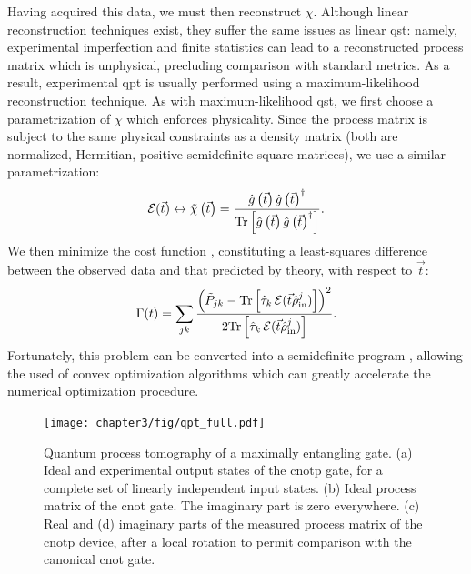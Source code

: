 Having acquired this data, we must then reconstruct $\chi$.
Although linear reconstruction techniques exist, they suffer the same issues as linear \gls{qst}: namely, experimental imperfection and finite statistics can lead to a reconstructed process matrix which is unphysical, precluding comparison with standard metrics.  
As a result, experimental \gls{qpt} is usually performed using a maximum-likelihood reconstruction technique.
As with maximum-likelihood \gls{qst}, we first choose a parametrization of $\chi$ which enforces physicality. 
Since the process matrix is subject to the same physical constraints as a density matrix (both are normalized, Hermitian, positive-semidefinite square matrices), we use a similar parametrization:
\begin{equation}
    \mathcal{E}(\vec{t}) \leftrightarrow \tilde{\chi}\left( \vec{t} \right) = 
    \frac{\hat{g}\left(\vec{t}\right) \hat{g}\left(\vec{t}\right)^{\dagger}}
    {\mathrm{Tr} \left[ \hat{g}\left(\vec{t}\right) \hat{g}\left(\vec{t}\right)^{\dagger} \right]}.
\end{equation}
We then minimize the cost function \cite{White2007}, constituting a least-squares difference between the observed data and that predicted by theory, with respect to $\vec{t}$:
\begin{equation}
    \Gamma(\vec{t}) = \sum_{jk} 
    \frac{
    \left(\tilde{P}_{jk} - 
    \mathrm{Tr} 
    \left[ \hat{\tau}_k \, \mathcal{E} (\vec{t} \hat{\rho}_{\mathrm{in}}^j) \right]
    \right)^2} {
    2 \mathrm{Tr} 
    \left[ \hat{\tau}_k \, \mathcal{E} (\vec{t} \hat{\rho}_{\mathrm{in}}^j) \right]
    }.
\end{equation}
Fortunately, this problem can be converted into a semidefinite program \cite{Ballo2010, LangfordThesis}, allowing the used of convex optimization algorithms which can greatly accelerate the numerical optimization procedure.

\begin{figure}[t!]
\centering
\texttt{[image: chapter3/fig/qpt\_full.pdf]}
\caption[Quantum process tomography of a maximally entangling gate.]{Quantum process tomography of a maximally entangling gate. (a) Ideal and experimental output states of the \gls{cnotp} gate, for a complete set of linearly independent input states. (b) Ideal process matrix of the \acrshort{cnot} gate. The imaginary part is zero everywhere. (c) Real and (d) imaginary parts of the measured process matrix of the \gls{cnotp} device, after a local rotation to permit comparison with the canonical \gls{cnot} gate.
}
\label{fig:qpt}
\end{figure}


